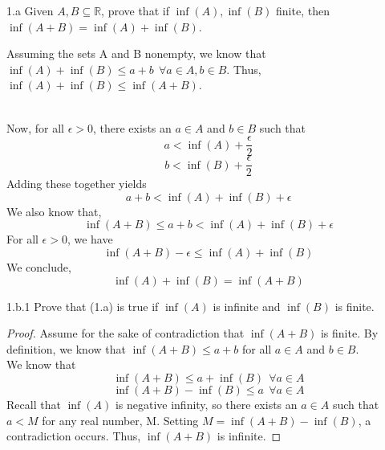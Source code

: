 \documentclass[boxes]{rutgers_hw}
\author{Rohan Karamel} %
\date{\today} %
\begin{document}
\maketitle


\begin{exern}{1.a} 
  Given $A, B \subseteq \mathbb{R}$, prove that if $\inf(A), \inf(B)$ finite, then $\inf(A+B) = \inf(A) + \inf(B)$.
\end{exern}
\begin{solution}
  Assuming the sets A and B nonempty, we know that \\ $\inf(A) + \inf(B) \le a + b \ \ \forall a \in A, b \in B $.
  Thus, $\inf(A) + \inf(B) \le \inf(A+B)$.

  \hfill \\
  Now, for all $\epsilon > 0$, there exists an $a \in A$ and $b \in B$ such that
  \[ a < \inf(A) + \frac{\epsilon}{2}\]
  \[ b < \inf(B) + \frac{\epsilon}{2}\]
  Adding these together yields
  \[ a + b < \inf(A) + \inf(B) + \epsilon\]
  We also know that,
  \[ \inf(A+B) \le a + b < \inf(A) + \inf(B) + \epsilon \]
  For all $\epsilon > 0$, we have
  \[ \inf(A + B) - \epsilon \le \inf(A) + \inf(B) \]
  We conclude,
  \[ \inf(A) + \inf(B) = \inf(A + B) \]
\end{solution}

\pagebreak

\begin{exern}{1.b.1} 
  Prove that (1.a) is true if $\inf(A)$ is infinite and $\inf(B)$ is finite.
\end{exern}
\begin{proof} 
  Assume for the sake of contradiction that $\inf(A+B)$ is finite. 
  By definition, we know that $\inf(A + B) \le a + b$ for all $a \in A$ and $b \in B$. \\
  We know that
  \[\inf(A+B) \le a + \inf(B) \ \ \forall a \in A\]
  \[\inf(A+B) - \inf(B) \le a \ \ \forall a \in A\]
  Recall that $\inf(A)$ is negative infinity, so there exists an $a \in A$ such that $a < M$ for any real number, M.
  Setting $M = \inf(A+B) - \inf(B)$, a contradiction occurs.
  Thus, $\inf(A+B)$ is infinite.
\end{proof}

\end{document}
